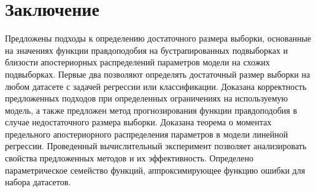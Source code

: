 \section{Заключение}

Предложены подходы к определению достаточного размера выборки, основанные на значениях функции правдоподобия на бустрапированных подвыборках и близости апостериорных распределений параметров модели на схожих подвыборках. Первые два позволяют определять достаточный размер выборки на любом датасете с задачей регрессии или классификации. Доказана корректность предложенных подходов при определенных ограничениях на используемую модель, а также предложен метод прогнозирования функции правдоподобия в случае недостаточного размера выборки. Доказана теорема о моментах предельного апостериорного распределения параметров в модели линейной регрессии. Проведенный вычислительный эксперимент позволяет анализировать свойства предложенных методов и их эффективность. Определено параметрическое семейство функций, аппроксимирующее функцию ошибки для набора датасетов. 